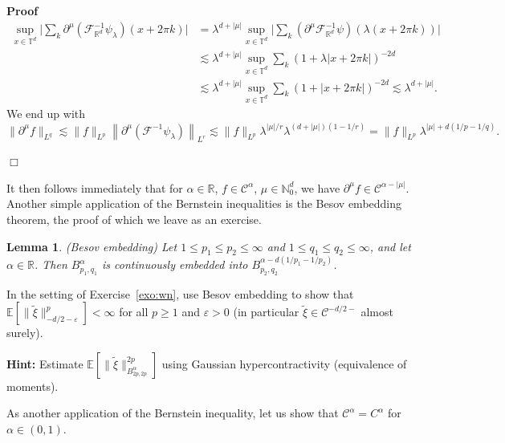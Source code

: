 \documentclass[a4paper,11pt]{article}
\newcommand{\tmtextbf}[1]{{\bfseries{#1}}}
\newenvironment{proof}{\noindent\textbf{Proof\ }}{\hspace*{\fill}$\Box$\medskip}
\newtheorem{lemma}{Lemma}
{\theorembodyfont{\rmfamily}\newtheorem{remark}{Remark}}
\newcommand{\CF}{\mathscr{F}}
\newcommand{\CC}{\mathscr{C}}
\begin{document}
\begin{proof}
\begin{align*}
     \sup_{x \in \mathbb{T}^d} \Big| \sum_k \partial^{{\mu}} (\CF^{- 1}_{\mathbb{R}^d} \psi_{\lambda}) (x + 2 \pi k) \Big| & =  \lambda^{d + | {\mu} |} \sup_{x \in \mathbb{T}^d} \Big| \sum_k ( \partial^{{\mu}} \CF^{- 1}_{\mathbb{R}^d} \psi ) (\lambda (x + 2 \pi k)) \Big| \\
     & \lesssim \lambda^{d + | {\mu} |} \sup_{x \in \mathbb{T}^d} \sum_k (1 + \lambda | x + 2 \pi k |)^{- 2 d} \\
     & \lesssim \lambda^{d + | {\mu} |} \sup_{x \in \mathbb{T}^d} \sum_k (1 + | x + 2 \pi k |)^{- 2 d} \lesssim \lambda^{d + | {\mu} |}.
  \end{align*}
  We end up with
  \[ \| \partial^{{\mu}} f \|_{L^q} \lesssim \| f \|_{L^p} \left\|
     \partial^{{\mu}} \left( \CF^{- 1} \psi_{\lambda} \right)
     \right\|_{L^r} \lesssim \| f \|_{L^p} \lambda^{| {\mu} | / r}
     \lambda^{(d + | {\mu} |) (1 - 1 / r)} = \| f \|_{L^p} \lambda^{|
     {\mu} | + d (1 / p - 1 / q)} . \]
  
\end{proof}

It then follows immediately that for $\alpha \in \mathbb{R}$, $f \in
\CC^{\alpha}$, ${\mu} \in \mathbb{N}^d_0$, we have $\partial^{{\mu}}
f \in \CC^{\alpha - | {\mu} |}$. Another simple application of the
Bernstein inequalities is the Besov embedding theorem, the proof of which we
leave as an exercise.

\begin{lemma}
  \label{lem:besov embedding}(Besov embedding) Let $1 \leqslant p_1 \leqslant
  p_2 \leqslant \infty$ and $1 \leqslant q_1 \leqslant q_2 \leqslant \infty$,
  and let $\alpha \in \mathbb{R}$. Then $B^{\alpha}_{p_1, q_1}$ is
  continuously embedded into $B^{\alpha - d (1 / p_1 - 1 / p_2)}_{p_2, q_2}$.
\end{lemma}

\begin{exercise}
  \label{exo:wn besov}In the setting of Exercise~\ref{exo:wn}, use Besov
  embedding to show that $\mathbb{E} [\| \tilde{\xi}
  \|_{- d / 2 - \varepsilon}^p] < \infty$ for all $p \geqslant 1$ and
  $\varepsilon > 0$ (in particular $\tilde{\xi} \in \CC^{- d / 2 -}$ almost
  surely).
  
  \tmtextbf{Hint:} Estimate $\mathbb{E} [\| \tilde{\xi} \|_{B^{\alpha}_{2 p,
  2 p}}^{2 p}]$ using Gaussian hypercontractivity (equivalence of moments).
\end{exercise}

As another application of the Bernstein inequality, let us show that
$\CC^{\alpha} = C^{\alpha}$ for $\alpha \in (0, 1)$.
\end{document}

